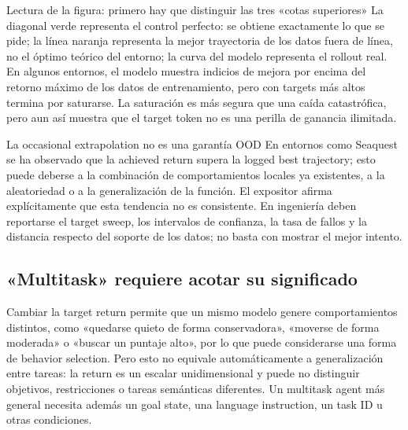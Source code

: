 
\begin{knowledgebox}{Lectura de la figura: primero hay que distinguir las tres «cotas superiores»}
La diagonal verde representa el control perfecto: se obtiene exactamente lo que se pide; la línea naranja representa la mejor trayectoria de los datos fuera de línea, no el óptimo teórico del entorno; la curva del modelo representa el rollout real. En algunos entornos, el modelo muestra indicios de mejora por encima del retorno máximo de los datos de entrenamiento, pero con targets más altos termina por saturarse. La saturación es más segura que una caída catastrófica, pero aun así muestra que el target token no es una perilla de ganancia ilimitada.
\end{knowledgebox}

\begin{warningbox}{La occasional extrapolation no es una garantía OOD}
En entornos como Seaquest se ha observado que la achieved return supera la logged best trajectory; esto puede deberse a la combinación de comportamientos locales ya existentes, a la aleatoriedad o a la generalización de la función. El expositor afirma explícitamente que esta tendencia no es consistente. En ingeniería deben reportarse el target sweep, los intervalos de confianza, la tasa de fallos y la distancia respecto del soporte de los datos; no basta con mostrar el mejor intento.
\end{warningbox}


\subsection{«Multitask» requiere acotar su significado}

Cambiar la target return permite que un mismo modelo genere comportamientos distintos, como «quedarse quieto de forma conservadora», «moverse de forma moderada» o «buscar un puntaje alto», por lo que puede considerarse una forma de behavior selection. Pero esto no equivale automáticamente a generalización entre tareas: la return es un escalar unidimensional y puede no distinguir objetivos, restricciones o tareas semánticas diferentes. Un multitask agent más general necesita además un goal state, una language instruction, un task ID u otras condiciones.

